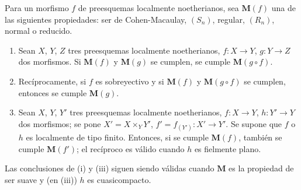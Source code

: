 \begin{proposition}[6.8.3]
\label{IV.2.s6.8.3-fr}
Para un morfismo $f$ de preesquemas localmente noetherianos, sea $\boldsymbol{M}(f)$
una de las siguientes propiedades: ser de Cohen-Macaulay, $(S_n)$, regular,
$(R_n)$, normal o reducido.
\begin{enumerate}
\item[\textup{(i)}] Sean $X$, $Y$, $Z$ tres preesquemas localmente noetherianos,
$f:X\to Y$, $g:Y\to Z$ dos morfismos. Si $\boldsymbol{M}(f)$ y $\boldsymbol{M}(g)$ se cumplen,
se cumple $\boldsymbol{M}(g\circ f)$.
\item[\textup{(ii)}] Recíprocamente, si $f$ es sobreyectivo y si $\boldsymbol{M}(f)$ y $\boldsymbol{M}(g\circ f)$
se cumplen, entonces se cumple $\boldsymbol{M}(g)$.
\item[\textup{(iii)}] Sean $X$, $Y$, $Y'$ tres preesquemas localmente noetherianos,
$f:X\to Y$, $h:Y'\to Y$ dos morfismos; se pone $X'=X\times_Y Y'$,
$f'=f_{(Y')}:X'\to Y'$. Se supone que $f$ o $h$ es localmente de tipo
finito. Entonces, si se cumple $\boldsymbol{M}(f)$, también se cumple $\boldsymbol{M}(f')$; el recíproco
es válido cuando $h$ es fielmente plano.
\end{enumerate}
Las conclusiones de \textup{(i)} y \textup{(iii)} siguen siendo válidas cuando $\boldsymbol{M}$ es la propiedad
de ser suave y (en \textup{(iii)}) $h$ es cuasicompacto.
\end{proposition}

